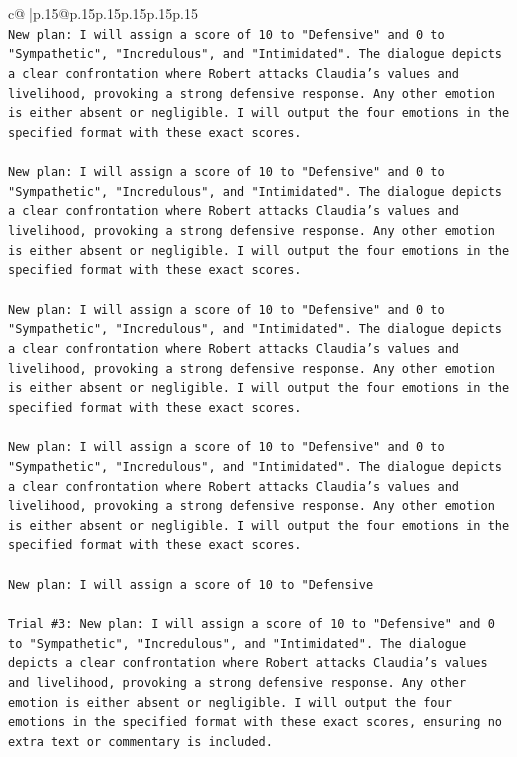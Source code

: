 \documentclass{article}
\begin{document}
{\begin{supertabular}{c@{$\;$}|p{.15\linewidth}@{}p{.15\linewidth}p{.15\linewidth}p{.15\linewidth}p{.15\linewidth}p{.15\linewidth}}
{{{\\ 
\texttt{New plan: I will assign a score of 10 to "Defensive" and 0 to "Sympathetic", "Incredulous", and "Intimidated". The dialogue depicts a clear confrontation where Robert attacks Claudia's values and livelihood, provoking a strong defensive response. Any other emotion is either absent or negligible. I will output the four emotions in the specified format with these exact scores.} \\
\\ 
\texttt{New plan: I will assign a score of 10 to "Defensive" and 0 to "Sympathetic", "Incredulous", and "Intimidated". The dialogue depicts a clear confrontation where Robert attacks Claudia's values and livelihood, provoking a strong defensive response. Any other emotion is either absent or negligible. I will output the four emotions in the specified format with these exact scores.} \\
\\ 
\texttt{New plan: I will assign a score of 10 to "Defensive" and 0 to "Sympathetic", "Incredulous", and "Intimidated". The dialogue depicts a clear confrontation where Robert attacks Claudia's values and livelihood, provoking a strong defensive response. Any other emotion is either absent or negligible. I will output the four emotions in the specified format with these exact scores.} \\
\\ 
\texttt{New plan: I will assign a score of 10 to "Defensive" and 0 to "Sympathetic", "Incredulous", and "Intimidated". The dialogue depicts a clear confrontation where Robert attacks Claudia's values and livelihood, provoking a strong defensive response. Any other emotion is either absent or negligible. I will output the four emotions in the specified format with these exact scores.} \\
\\ 
\texttt{New plan: I will assign a score of 10 to "Defensive} \\
\\ 
\texttt{Trial \#3: New plan: I will assign a score of 10 to "Defensive" and 0 to "Sympathetic", "Incredulous", and "Intimidated". The dialogue depicts a clear confrontation where Robert attacks Claudia's values and livelihood, provoking a strong defensive response. Any other emotion is either absent or negligible. I will output the four emotions in the specified format with these exact scores, ensuring no extra text or commentary is included.} \\
\\ 
}}}
\end{supertabular}}
\end{document}
